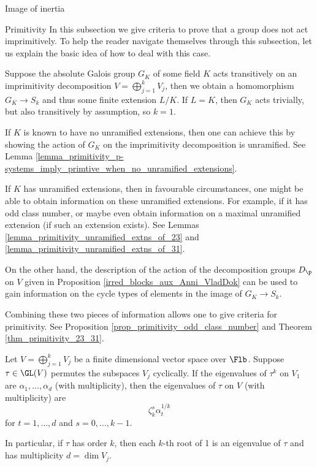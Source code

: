 \documentclass[11pt,a4paper]{article}
\begin{document}
\begin{section}{Image of inertia}
\begin{subsection}{Primitivity}
In this subsection we give criteria to prove that a group does not act imprimitively.
To help the reader navigate themselves through this subsection, let us explain the basic idea of how to deal with this case.

Suppose the absolute Galois group $G_K$ of some field $K$ acts transitively on an imprimitivity decomposition $V= \bigoplus^k_{j=1} V_j$, then we obtain a homomorphism $G_K \rightarrow S_k$ and thus some finite extension $L/K$.
If $L=K$, then $G_K$ acts trivially, but also transitively by assumption, so $k=1$.

If $K$ is known to have no unramified extensions, then one can achieve this by showing the action of $G_K$ on the imprimitivity decomposition is unramified.
See Lemma \ref{lemma_primitivity_p-systems_imply_primtive_when_no_unramified_extensions}.

If $K$ has unramified extensions, then in favourable circumstances, one might be able to obtain information on these unramified extensions.
For example, if it has odd class number, or maybe even obtain information on a maximal unramified extension (if such an extension exists).
See Lemmas \ref{lemma_primitivity_unramified_extns_of_23} and \ref{lemma_primitivity_unramified_extns_of_31}.

On the other hand, the description of the action of the decomposition groups $D_\p$ on $V$ given in Proposition \ref{irred_blocks_aux_Anni_VladDok} can be used to gain information on the cycle types of elements in the image of $G_K \rightarrow S_k$.

Combining these two pieces of information allows one to give criteria for primitivity. See Proposition \ref{prop_primitivity_odd_class_number} and Theorem \ref{thm_primitivity_23_31}.

\begin{lemma}{\cite[Lemma 4.15]{Anni_VDok}}
\label{lemma_primitive_evalues}
Let $V= \bigoplus^k_{j=1} V_j$ be a finite dimensional vector space over $\Flb$. Suppose $\tau \in \GL(V)$ permutes the subspaces $V_j$ cyclically. If the eigenvalues of $\tau^k$ on $V_1$ are $\alpha_1 , \ldots , \alpha_d$ (with multiplicity), then the eigenvalues of $\tau$ on $V$ (with multiplicity) are 
\[\zeta_k^s \alpha_t^{1/k}\]
for $t = 1, \ldots, d$ and $s = 0, \ldots, k-1$.

In particular, if $\tau$ has order $k$, then each $k$-th root of 1 is an eigenvalue of $\tau$ and has multiplicity $d=\dim V_j$.
\end{lemma}


\end{subsection}
\end{section}
\end{document}
